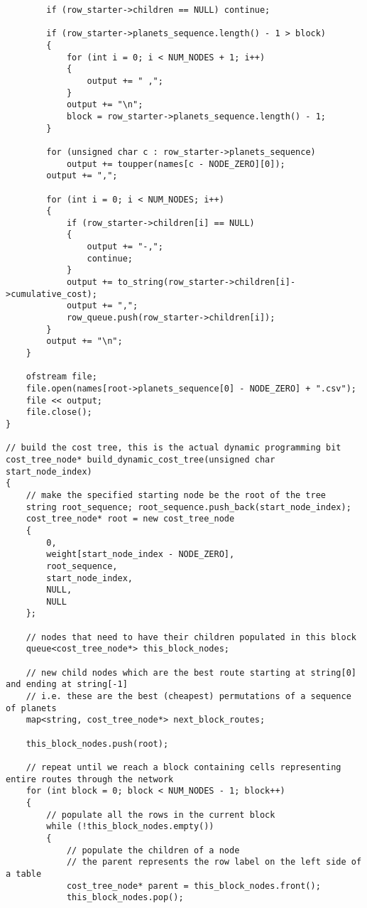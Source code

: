 \documentclass[
]{article}
\begin{document}
\begin{verbatim}
        if (row_starter->children == NULL) continue;

        if (row_starter->planets_sequence.length() - 1 > block)
        {
            for (int i = 0; i < NUM_NODES + 1; i++)
            {
                output += " ,";
            }
            output += "\n";
            block = row_starter->planets_sequence.length() - 1;
        }

        for (unsigned char c : row_starter->planets_sequence)
            output += toupper(names[c - NODE_ZERO][0]);
        output += ",";

        for (int i = 0; i < NUM_NODES; i++)
        {
            if (row_starter->children[i] == NULL)
            {
                output += "-,";
                continue;
            }
            output += to_string(row_starter->children[i]->cumulative_cost);
            output += ",";
            row_queue.push(row_starter->children[i]);
        }
        output += "\n";
    }

    ofstream file;
    file.open(names[root->planets_sequence[0] - NODE_ZERO] + ".csv");
    file << output;
    file.close();
}

// build the cost tree, this is the actual dynamic programming bit
cost_tree_node* build_dynamic_cost_tree(unsigned char start_node_index)
{
    // make the specified starting node be the root of the tree
    string root_sequence; root_sequence.push_back(start_node_index);
    cost_tree_node* root = new cost_tree_node
    {
        0,
        weight[start_node_index - NODE_ZERO],
        root_sequence,
        start_node_index,
        NULL,
        NULL
    };

    // nodes that need to have their children populated in this block
    queue<cost_tree_node*> this_block_nodes;

    // new child nodes which are the best route starting at string[0] and ending at string[-1]
    // i.e. these are the best (cheapest) permutations of a sequence of planets
    map<string, cost_tree_node*> next_block_routes;

    this_block_nodes.push(root);

    // repeat until we reach a block containing cells representing entire routes through the network
    for (int block = 0; block < NUM_NODES - 1; block++)
    {
        // populate all the rows in the current block
        while (!this_block_nodes.empty())
        {
            // populate the children of a node
            // the parent represents the row label on the left side of a table
            cost_tree_node* parent = this_block_nodes.front();
            this_block_nodes.pop();


\end{verbatim}
\end{document}
